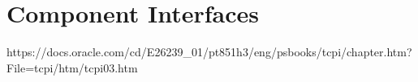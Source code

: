 \documentclass[../../../../dd.tex]{subfiles}
\begin{document}
	\section{Component Interfaces}
		https://docs.oracle.com/cd/E26239_01/pt851h3/eng/psbooks/tcpi/chapter.htm?File=tcpi/htm/tcpi03.htm
	
\end{document}
